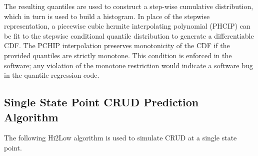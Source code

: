 The resulting quantiles are used to construct a step-wise cumulative distribution, which in turn is used to build a histogram. 
In place of the stepwise representation, a piecewise cubic hermite interpolating polynomial (PHCIP) can be fit to the stepwise conditional quantile distribution to generate a differentiable CDF.
The PCHIP interpolation preserves monotonicity of the CDF if the provided quantiles are strictly monotone.  This condition is enforced in the software; any violation of the monotone restriction would indicate a software bug in the quantile regression code.

\subsection{Single State Point CRUD Prediction Algorithm}

The following Hi2Low algorithm is used to simulate CRUD at a single state point.

